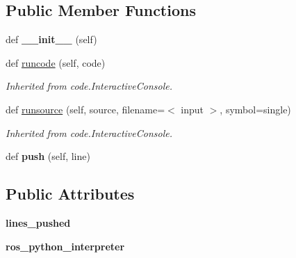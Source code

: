 \subsection*{Public Member Functions}
\begin{DoxyCompactItemize}
\item 
\mbox{\label{classros__nodes_1_1run__command_1_1DynamicGraphInteractiveConsole_a07b741ddfb4d749aca2d5ffe9e600b3d}} 
def {\bfseries \+\_\+\+\_\+init\+\_\+\+\_\+} (self)
\item 
def \hyperlink{classros__nodes_1_1run__command_1_1DynamicGraphInteractiveConsole_a2ef2227d691887e3dd6675c0df5acc2c}{runcode} (self, code)
\begin{DoxyCompactList}\small\item\em Inherited from code.\+Interactive\+Console. \end{DoxyCompactList}\item 
def \hyperlink{classros__nodes_1_1run__command_1_1DynamicGraphInteractiveConsole_a20a3fd5163e9cd015837fde8e6cead02}{runsource} (self, source, filename=\textquotesingle{}$<$ input $>$\textquotesingle{}, symbol=\textquotesingle{}single\textquotesingle{})
\begin{DoxyCompactList}\small\item\em Inherited from code.\+Interactive\+Console. \end{DoxyCompactList}\item 
\mbox{\label{classros__nodes_1_1run__command_1_1DynamicGraphInteractiveConsole_abf532b80ab37a9938e353e98e9a5c5a7}} 
def {\bfseries push} (self, line)
\end{DoxyCompactItemize}
\subsection*{Public Attributes}
\begin{DoxyCompactItemize}
\item 
\mbox{\label{classros__nodes_1_1run__command_1_1DynamicGraphInteractiveConsole_a1d64acd7b772889fc847983bfefc5a79}} 
{\bfseries lines\+\_\+pushed}
\item 
\mbox{\label{classros__nodes_1_1run__command_1_1DynamicGraphInteractiveConsole_a50579867ed5087f14bf681356cdcf914}} 
{\bfseries ros\+\_\+python\+\_\+interpreter}
\end{DoxyCompactItemize}


